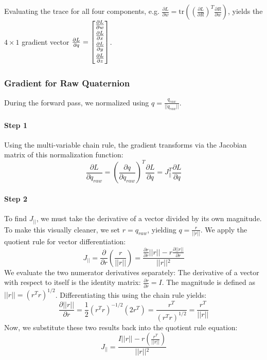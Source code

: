 Evaluating the trace for all four components, e.g. $\frac{\partial L}{\partial w} = \text{tr}\left( \left(\frac{\partial L}{\partial R}\right)^T \frac{\partial R}{\partial w} \right)$, yields the $4 \times 1$ gradient vector $\frac{\partial L}{\partial q} = \begin{bmatrix} \vspace{1mm} \frac{\partial L}{\partial w} \\ \vspace{1mm} \frac{\partial L}{\partial x} \\ \vspace{1mm} \frac{\partial L}{\partial y} \\ \vspace{1mm} \frac{\partial L}{\partial z} \end{bmatrix}$.

\subsubsection{Gradient for Raw Quaternion}

During the forward pass, we normalized using $q = \frac{q_{raw}}{\vert{}\vert{}q_{raw}\vert{}\vert{}}$.

\paragraph{Step 1} Using the multi-variable chain rule, the gradient transforms via the Jacobian matrix of this normalization function:
$$\frac{\partial L}{\partial q_{raw}} = \left( \frac{\partial q}{\partial q_{raw}} \right)^T \frac{\partial L}{\partial q} = J_{\vert{}\vert{}}^T \frac{\partial L}{\partial q}$$

\paragraph{Step 2} To find $J_{\vert{}\vert{}}$, we must take the derivative of a vector divided by its own magnitude. To make this visually cleaner, we set $r = q_{raw}$, yielding $q = \frac{r}{\vert{}\vert{}r\vert{}\vert{}}$. 
We apply the quotient rule for vector differentiation:
$$
J_{\vert{}\vert{}} =
\frac{\partial}{\partial r} \left( \frac{r}{\vert{}\vert{}r\vert{}\vert{}} \right) =
\frac{\frac{\partial r}{\partial r} \vert{}\vert{}r\vert{}\vert{} - r \frac{\partial \vert{}\vert{}r\vert{}\vert{}}{\partial r}}{\vert{}\vert{}r\vert{}\vert{}^2}
$$
We evaluate the two numerator derivatives separately: The derivative of a vector with respect to itself is the identity matrix: $\frac{\partial r}{\partial r} = I$. The magnitude is defined as $\vert{}\vert{}r\vert{}\vert{} = (r^T r)^{1/2}$. Differentiating this using the chain rule yields:
$$
\frac{\partial \vert{}\vert{}r\vert{}\vert{}}{\partial r} =
\frac{1}{2} (r^T r)^{-1/2} (2 r^T) =
\frac{r^T}{(r^T r)^{1/2}} =
\frac{r^T}{\vert{}\vert{}r\vert{}\vert{}}
$$
Now, we substitute these two results back into the quotient rule equation:
$$
J_{\vert{}\vert{}} =
\frac{I \vert{}\vert{}r\vert{}\vert{} - r \left( \frac{r^T}{\vert{}\vert{}r\vert{}\vert{}} \right)}{\vert{}\vert{}r\vert{}\vert{}^2}
$$

